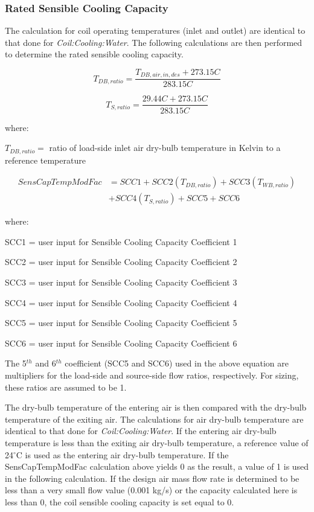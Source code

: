\subsubsection{Rated Sensible Cooling Capacity}\label{rated-sensible-cooling-capacity}

The calculation for coil operating temperatures (inlet and outlet) are identical to that done for \emph{Coil:Cooling:Water}. The following calculations are then performed to determine the rated sensible cooling capacity.

\begin{equation}
  T_{DB,ratio} = \frac{T_{DB,air,in,des}+273.15C}{283.15C}
\end{equation}

\begin{equation}
  T_{S,ratio} = \frac{29.44C+273.15C}{283.15C}
\end{equation}

where:
 
$T_{DB,ratio} = $ ratio of load-side inlet air dry-bulb temperature in Kelvin to a reference temperature

\begin{equation}
  \begin{array}{rl}
    SensCapTempModFac &= SCC1 + SCC2\left( {{T_{DB,ratio}}} \right) + SCC3\left( {{T_{WB,ratio}}} \right) \\
                      &+ SCC4\left( {{T_{S,ratio}}} \right) + SCC5 + SCC6
  \end{array}
\end{equation}

where:

SCC1 = user input for Sensible Cooling Capacity Coefficient 1

SCC2 = user input for Sensible Cooling Capacity Coefficient 2

SCC3 = user input for Sensible Cooling Capacity Coefficient 3

SCC4 = user input for Sensible Cooling Capacity Coefficient 4

SCC5 = user input for Sensible Cooling Capacity Coefficient 5

SCC6 = user input for Sensible Cooling Capacity Coefficient 6


The 5\(^{th}\) and 6\(^{th}\) coefficient (SCC5 and SCC6) used in the above equation are multipliers for the load-side and source-side flow ratios, respectively. For sizing, these ratios are assumed to be 1.

The dry-bulb temperature of the entering air is then compared with the dry-bulb temperature of the exiting air. The calculations for air dry-bulb temperature are identical to that done for \emph{Coil:Cooling:Water}. If the entering air dry-bulb temperature is less than the exiting air dry-bulb temperature, a reference value of 24\(^{\circ}\)C is used as the entering air dry-bulb temperature. If the SensCapTempModFac calculation above yields 0 as the result, a value of 1 is used in the following calculation. If the design air mass flow rate is determined to be less than a very small flow value (0.001 kg/s) or the capacity calculated here is less than 0, the coil sensible cooling capacity is set equal to 0.

